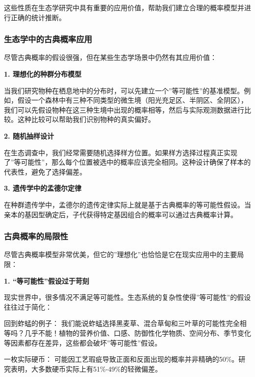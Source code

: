 \documentclass[
]{book}
\begin{document}
这些性质在生态学研究中具有重要的应用价值，帮助我们建立合理的概率模型并进行正确的统计推断。

\hypertarget{ux751fux6001ux5b66ux4e2dux7684ux53e4ux5178ux6982ux7387ux5e94ux7528}{%
\subsubsection{生态学中的古典概率应用}\label{ux751fux6001ux5b66ux4e2dux7684ux53e4ux5178ux6982ux7387ux5e94ux7528}}

尽管古典概率的假设很强，但在某些生态学场景中仍然有其应用价值：

\textbf{1. 理想化的种群分布模型}

当我们研究物种在栖息地中的分布时，可以先建立一个''等可能性''的基准模型。例如，假设一个森林中有三种不同类型的微生境（阳光充足区、半阴区、全阴区），我们可以先假设物种在这三种生境中出现的概率相等，然后与实际观测数据进行比较。这种比较可以帮助我们识别物种的真实偏好。

\textbf{2. 随机抽样设计}

在生态调查中，我们经常需要随机选择样方位置。如果样方选择过程真正实现了''等可能性''，那么每个位置被选中的概率应该完全相同。这种设计确保了样本的代表性，避免了选择偏差。

\textbf{3. 遗传学中的孟德尔定律}

在种群遗传学中，孟德尔的遗传定律实际上就是基于古典概率的等可能性假设。当亲本的基因型确定后，子代获得特定基因组合的概率可以通过古典概率计算。

\hypertarget{ux53e4ux5178ux6982ux7387ux7684ux5c40ux9650ux6027}{%
\subsubsection{古典概率的局限性}\label{ux53e4ux5178ux6982ux7387ux7684ux5c40ux9650ux6027}}

尽管古典概率模型非常优美，但它的''理想化''也恰恰是它在现实应用中的主要局限：

\textbf{1. ``等可能性''假设过于苛刻}

现实世界中，很多情况不满足等可能性。生态系统的复杂性使得''等可能性''的假设往往过于简化：

回到蚱蜢的例子： 我们能说蚱蜢选择黑麦草、混合草甸和三叶草的可能性完全相等吗？几乎不能！植物的营养价值、口感、防御性化学物质、空间分布、季节变化等因素都存在差异，这些都会破坏''等可能性''假设。

一枚实际硬币： 可能因工艺瑕疵导致正面和反面出现的概率并非精确的50\%。研究表明，大多数硬币实际上有51\%-49\%的轻微偏差。
\end{document}
